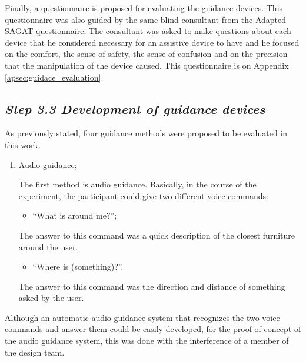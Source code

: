         Finally, a questionnaire is proposed for evaluating the guidance devices. This questionnaire was also guided by the same blind consultant from the Adapted SAGAT questionnaire. The consultant was asked to make questions about each device that he considered necessary for an assistive device to have and he focused on the comfort, the sense of safety, the sense of confusion and on the precision that the manipulation of the device caused. This questionnaire is on Appendix \ref{apsec:guidace_evaluation}.
        
    \subsection*{\textit{Step 3.3 Development of guidance devices}}

        As previously stated, four guidance methods were proposed to be evaluated in this work.
        
        \begin{enumerate} [label = \Alph*)]
            \item Audio guidance;
            
            The first method is audio guidance. Basically, in the course of the experiment, the participant could give two different voice commands:

            \begin{itemize} [label = --]
                \item “What is around me?”;
            \end{itemize}

            The answer to this command was a quick description of the closest furniture around the user.

            \begin{itemize} [label = --]
                \item “Where is (something)?”.
            \end{itemize}

            The answer to this command was the direction and distance of something asked by the user.

        \end{enumerate}

        Although an automatic audio guidance system that recognizes the two voice commands and answer them could be easily developed, for the proof of concept of the audio guidance system, this was done with the interference of a member of the design team.

